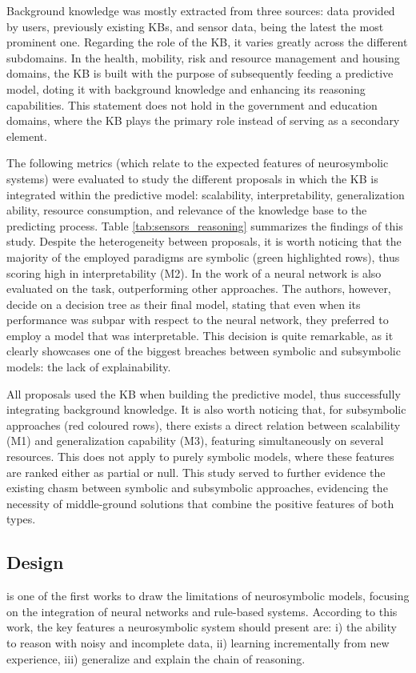 Background knowledge was mostly extracted from three sources: data provided by users, previously existing KBs, and sensor data, being the latest the most prominent one. Regarding the role of the KB, it varies greatly across the different subdomains. In the health, mobility, risk and resource management and housing domains, the KB is built with the purpose of subsequently feeding a predictive model, doting it with background knowledge and enhancing its reasoning capabilities. This statement does not hold in the government and education domains, where the KB plays the primary role instead of serving as a secondary element.

The following metrics (which relate to the expected features of neurosymbolic systems) were evaluated to study the different proposals in which the KB is integrated within the predictive model: scalability, interpretability, generalization ability, resource consumption, and relevance of the knowledge base to the predicting process. Table \ref{tab:sensors_reasoning} summarizes the findings of this study. Despite the heterogeneity between proposals, it is worth noticing that the majority of the employed paradigms are symbolic (green highlighted rows), thus scoring high in interpretability (M2). In the work of \cite{olszewskiturek} a neural network is also evaluated on the task, outperforming other approaches. The authors, however, decide on a decision tree as their final model, stating that even when its performance was subpar with respect to the neural network, they preferred to employ a model that was interpretable. This decision is quite remarkable, as it clearly showcases one of the biggest breaches between symbolic and subsymbolic models: the lack of explainability. 

All proposals used the KB when building the predictive model, thus successfully integrating background knowledge. It is also worth noticing that, for subsymbolic approaches (red coloured rows), there exists a direct relation between scalability (M1) and generalization capability (M3), featuring simultaneously on several resources. This does not apply to purely symbolic models, where these features are ranked either as partial or null. This study served to further evidence the existing chasm between symbolic and subsymbolic approaches, evidencing the necessity of middle-ground solutions that combine the positive features of both types.


\subsection{Design}\label{2_sec:subsec:design}
\cite{mcgarry_hybrid_1999} is one of the first works to draw the limitations of neurosymbolic models, focusing on the integration of neural networks and rule-based systems. According to this work, the key features a neurosymbolic system should present are: i) the ability to reason with noisy and incomplete data, ii) learning incrementally from new experience, iii) generalize and explain the chain of reasoning. %

